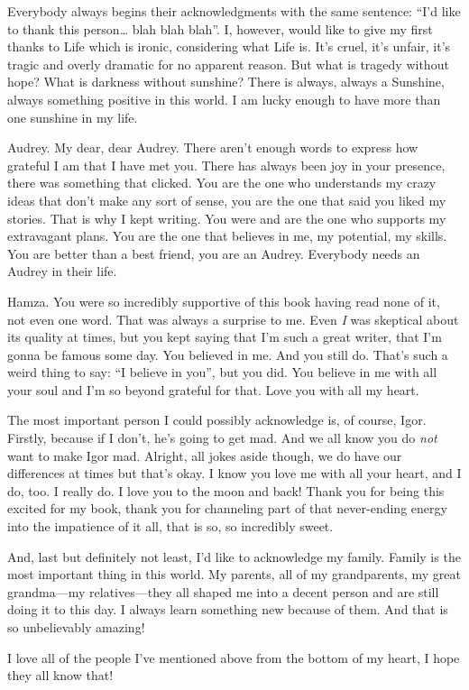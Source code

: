 Everybody always begins their acknowledgments with the same sentence: “I'd like to thank this person… blah blah blah”. I, however, would like to give my first thanks to Life which is ironic, considering what Life is. It's cruel, it's unfair, it's tragic and overly dramatic for no apparent reason. But what is tragedy without hope? What is darkness without sunshine? There is always, always a Sunshine, always something positive in this world. I am lucky enough to have more than one sunshine in my life.

Audrey. My dear, dear Audrey. There aren't enough words to express how grateful I am that I have met you. There has always been joy in your presence, there was something that clicked. You are the one who understands my crazy ideas that don't make any sort of sense, you are the one that said you liked my stories. That is why I kept writing. You were and are the one who supports my extravagant plans. You are the one that believes in me, my potential, my skills. You are better than a best friend, you are an Audrey. Everybody needs an Audrey in their life.

Hamza. You were so incredibly supportive of this book having read none of it, not even one word. That was always a surprise to me. Even \textit{I} was skeptical about its quality at times, but you kept saying that I'm such a great writer, that I'm gonna be famous some day. You believed in me. And you still do. That's such a weird thing to say: “I believe in you”, but you did. You believe in me with all your soul and I'm so beyond grateful for that. Love you with all my heart.

The most important person I could possibly acknowledge is, of course, Igor. Firstly, because if I don't, he's going to get mad. And we all know you do \textit{not} want to make Igor mad. Alright, all jokes aside though, we do have our differences at times but that's okay. I know you love me with all your heart, and I do, too. I really do. I love you to the moon and back! Thank you for being this excited for my book, thank you for channeling part of that never-ending energy into the impatience of it all, that is so, so incredibly sweet.

And, last but definitely not least, I'd like to acknowledge my family. Family is the most important thing in this world. My parents, all of my grandparents, my great grandma—my relatives—they all shaped me into a decent person and are still doing it to this day. I always learn something new because of them. And that is so unbelievably amazing!

I love all of the people I've mentioned above from the bottom of my heart, I hope they all know that!